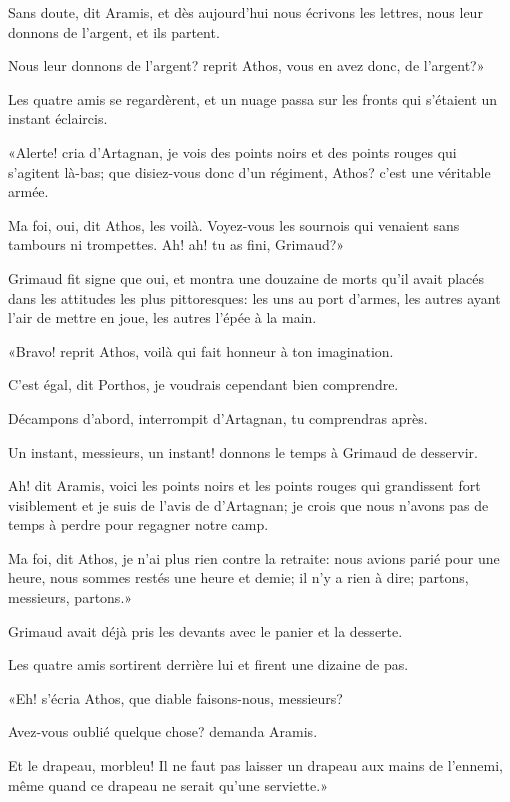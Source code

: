 \speak  Sans doute, dit Aramis, et dès aujourd'hui nous écrivons les lettres, nous leur donnons de l'argent, et ils partent. 

\speak  Nous leur donnons de l'argent? reprit Athos, vous en avez donc, de l'argent?» 

Les quatre amis se regardèrent, et un nuage passa sur les fronts qui s'étaient un instant éclaircis. 

«Alerte! cria d'Artagnan, je vois des points noirs et des points rouges qui s'agitent là-bas; que disiez-vous donc d'un régiment, Athos? c'est une véritable armée. 

\speak  Ma foi, oui, dit Athos, les voilà. Voyez-vous les sournois qui venaient sans tambours ni trompettes. Ah! ah! tu as fini, Grimaud?» 

Grimaud fit signe que oui, et montra une douzaine de morts qu'il avait placés dans les attitudes les plus pittoresques: les uns au port d'armes, les autres ayant l'air de mettre en joue, les autres l'épée à la main. 

«Bravo! reprit Athos, voilà qui fait honneur à ton imagination. 

\speak  C'est égal, dit Porthos, je voudrais cependant bien comprendre. 

\speak  Décampons d'abord, interrompit d'Artagnan, tu comprendras après. 

\speak  Un instant, messieurs, un instant! donnons le temps à Grimaud de desservir. 

\speak  Ah! dit Aramis, voici les points noirs et les points rouges qui grandissent fort visiblement et je suis de l'avis de d'Artagnan; je crois que nous n'avons pas de temps à perdre pour regagner notre camp. 

\speak  Ma foi, dit Athos, je n'ai plus rien contre la retraite: nous avions parié pour une heure, nous sommes restés une heure et demie; il n'y a rien à dire; partons, messieurs, partons.» 

Grimaud avait déjà pris les devants avec le panier et la desserte. 

Les quatre amis sortirent derrière lui et firent une dizaine de pas. 

«Eh! s'écria Athos, que diable faisons-nous, messieurs? 

\speak  Avez-vous oublié quelque chose? demanda Aramis. 

\speak  Et le drapeau, morbleu! Il ne faut pas laisser un drapeau aux mains de l'ennemi, même quand ce drapeau ne serait qu'une serviette.» 

